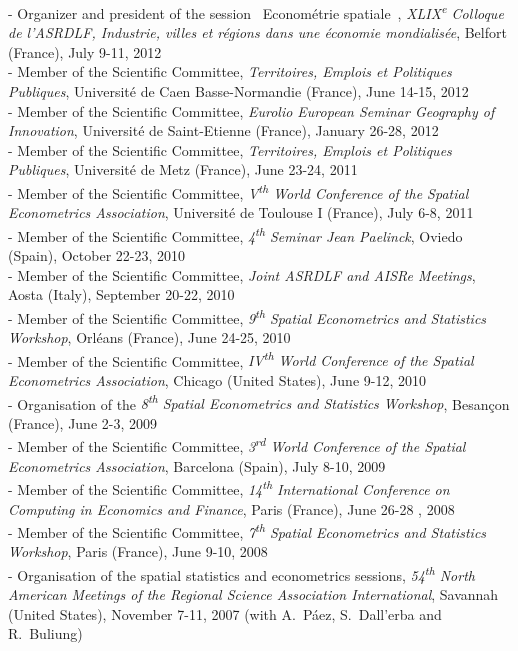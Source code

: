 \documentclass[a4paper,12pt]{article}
\begin{document}
- Organizer and president of the session \og~Econométrie spatiale~\fg, \textit{XLIX\textsuperscript{e} Colloque de l'ASRDLF, Industrie, villes et régions dans une économie mondialisée}, Belfort (France), July 9-11, 2012 \\
-  Member of the Scientific Committee, \textit{Territoires, Emplois et Politiques Publiques}, Université de Caen Basse-Normandie (France), June 14-15, 2012 \\
- Member of the Scientific Committee, \textit{Eurolio European Seminar Geography of Innovation}, Université de Saint-Etienne (France), January 26-28, 2012 \\
- Member of the Scientific Committee, \textit{Territoires, Emplois et Politiques Publiques}, Université de Metz (France), June 23-24, 2011 \\
- Member of the Scientific Committee, \textit{V\textsuperscript{th} World Conference of the Spatial Econometrics Association}, Université de Toulouse I (France), July 6-8, 2011 \\
- Member of the Scientific Committee, \textit{4\textsuperscript{th} Seminar Jean Paelinck}, Oviedo (Spain), October 22-23, 2010 \\
- Member of the Scientific Committee, \textit{Joint ASRDLF and AISRe Meetings}, Aosta (Italy), September 20-22, 2010\\
- Member of the Scientific Committee, \textit{9\textsuperscript{th} Spatial Econometrics and Statistics Workshop}, Orléans (France), June 24-25, 2010 \\
- Member of the Scientific Committee, \textit{IV\textsuperscript{th} World Conference of the Spatial Econometrics Association}, Chicago (United States), June 9-12, 2010 \\
- Organisation of the \textit{8\textsuperscript{th} Spatial Econometrics and Statistics Workshop}, Besançon (France), June 2-3, 2009 \\
- Member of the Scientific Committee, \textit{3\textsuperscript{rd} World Conference of the Spatial Econometrics Association}, Barcelona (Spain), July 8-10, 2009 \\
- Member of the Scientific Committee, \textit{14\textsuperscript{th} International Conference on Computing in Economics and Finance}, Paris (France), June 26-28 , 2008\\
- Member of the Scientific Committee, \textit{7\textsuperscript{th} Spatial Econometrics and Statistics Workshop}, Paris (France), June 9-10, 2008 \\
- Organisation of the spatial statistics and econometrics sessions, \textit{54\textsuperscript{th} North American Meetings of the Regional Science Association International}, Savannah (United States), November 7-11, 2007 (with A.~Páez, S.~Dall'erba and R.~Buliung) \\
\end{document}
